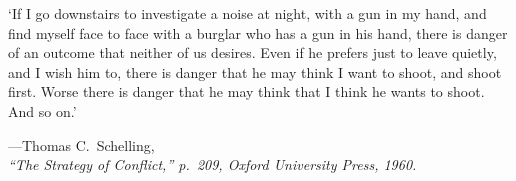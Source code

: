 \begin{RaggedRight}

\vspace*{2.2cm}

`If I go downstairs to investigate a noise at night, with a gun in my hand, and find myself face to face with a burglar who has a gun in his hand, there is danger of an outcome that neither of us desires. Even if he prefers just to leave quietly, and I wish him to, there is danger that he may think I want to shoot, and shoot first. Worse there is danger that he may think that I think he wants to shoot. And so on.'
\begin{flushright}
---Thomas C.~Schelling,\\
\emph{``The Strategy of Conflict,'' p.~209, Oxford University Press, 1960.}
\end{flushright}

\end{RaggedRight}